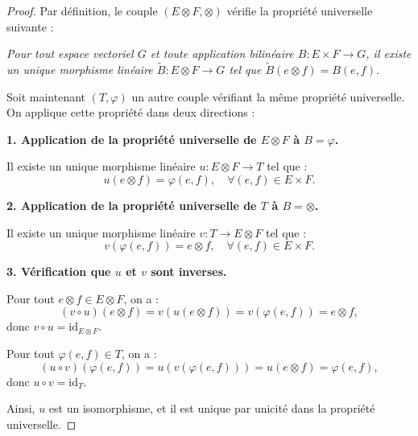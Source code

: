 \documentclass[12pt]{article}
\begin{document}
	\begin{proof}
	Par définition, le couple \( (E \otimes F, \otimes) \) vérifie la propriété universelle suivante :
		
		\emph{Pour tout espace vectoriel \( G \) et toute application bilinéaire \( B : E \times F \to G \), il existe un unique morphisme linéaire \( \tilde{B} : E \otimes F \to G \) tel que \( \tilde{B}(e \otimes f) = B(e, f) \).}
		
		Soit maintenant \( (T, \varphi) \) un autre couple vérifiant la même propriété universelle.  
		On applique cette propriété dans deux directions :
		
		\textbf{1. Application de la propriété universelle de \( E \otimes F \) à \( B = \varphi \).}
		
		Il existe un unique morphisme linéaire \( u : E \otimes F \to T \) tel que :
		\[
		u(e \otimes f) = \varphi(e, f), \quad \forall (e,f) \in E \times F.
		\]
		
		\textbf{2. Application de la propriété universelle de \( T \) à \( B = \otimes \).}
		
		Il existe un unique morphisme linéaire \( v : T \to E \otimes F \) tel que :
		\[
		v(\varphi(e, f)) = e \otimes f, \quad \forall (e,f) \in E \times F.
		\]
		
		\textbf{3. Vérification que \( u \) et \( v \) sont inverses.}
		
		Pour tout \( e \otimes f \in E \otimes F \), on a :
		\[
		(v \circ u)(e \otimes f) = v(u(e \otimes f)) = v(\varphi(e, f)) = e \otimes f,
		\]
		donc \( v \circ u = \mathrm{id}_{E \otimes F} \).
		
		Pour tout \( \varphi(e, f) \in T \), on a :
		\[
		(u \circ v)(\varphi(e, f)) = u(v(\varphi(e, f))) = u(e \otimes f) = \varphi(e, f),
		\]
		donc \( u \circ v = \mathrm{id}_T \).
		
		Ainsi, \( u \) est un isomorphisme, et il est unique par unicité dans la propriété universelle.
		
	\end{proof}
	
	
\end{document}
